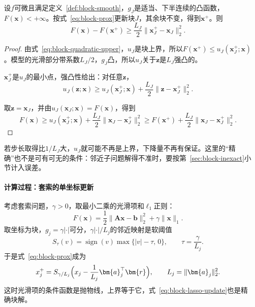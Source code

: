 \begin{lemma}[块邻近步的下降量]
\label{lem:block-prox-descent}
设$f$可微且满足定义~\ref{def:block-smooth}，$g_J$是适当、下半连续的凸函数，$F(\bm{x})<+\infty$。按式~\eqref{eq:block-prox}更新块$J$，其余块不变，得到$\bm{x}^{+}$。则
\begin{equation}
 F(\bm{x})-F(\bm{x}^{+})\geq\frac{L_J}{2}\lVert\bm{x}_J^{+}-\bm{x}_J\rVert_2^2 .
 \label{eq:block-prox-descent}
\end{equation}
\end{lemma}

\begin{proof}
由式~\eqref{eq:block-quadratic-upper}，$u_J$是块上界，所以$F(\bm{x}^{+})\leq u_J(\bm{x}_J^{+};\bm{x})$。模型的光滑部分带系数$L_J/2$，$g_J$凸，所以$u_J$关于$\bm{z}$是$L_J$强凸的。

$\bm{x}_J^{+}$是$u_J$的最小点，强凸性给出：对任意$\bm{z}$，
\[
 u_J(\bm{z};\bm{x})\geq u_J(\bm{x}_J^{+};\bm{x})+\frac{L_J}{2}\lVert\bm{z}-\bm{x}_J^{+}\rVert_2^2 .
\]

取$\bm{z}=\bm{x}_J$，并由$u_J(\bm{x}_J;\bm{x})=F(\bm{x})$，得到
\[
 F(\bm{x})\geq u_J(\bm{x}_J^{+};\bm{x})+\frac{L_J}{2}\lVert\bm{x}_J-\bm{x}_J^{+}\rVert_2^2\geq F(\bm{x}^{+})+\frac{L_J}{2}\lVert\bm{x}_J-\bm{x}_J^{+}\rVert_2^2 .
\]
\end{proof}

若步长取得比$1/L_J$大，$u_J$就可能不再是上界，下降量不再有保证。这里的“精确”也不是可有可无的条件：邻近子问题解得不准时，要按第~\ref{sec:block-inexact}小节计入误差。

\paragraph{计算过程：套索的单坐标更新}
考虑套索问题，$\gamma>0$，取最小二乘的光滑项和$\ell_1$正则：
\[
 F(\bm{x})=\frac12\lVert\bm{A}\bm{x}-\bm{b}\rVert_2^2+\gamma\lVert\bm{x}\rVert_1 .
\]
取坐标为块，$g_j=\gamma\lvert\cdot\rvert$可分，$\gamma\lvert\cdot\rvert/L_j$的邻近映射是软阈值
\begin{equation}
 S_{\tau}(v)=\operatorname{sign}(v)\max\{\lvert v\rvert-\tau,\,0\},\qquad \tau=\frac{\gamma}{L_j}.
 \label{eq:block-soft-threshold}
\end{equation}
于是式~\eqref{eq:block-prox}成为
\begin{equation}
 x_j^{+}=S_{\gamma/L_j}\Bigl(x_j-\frac{1}{L_j}\bm{a}_j^\top\bm{r}\Bigr),\qquad L_j=\lVert\bm{a}_j\rVert_2^2 .
 \label{eq:block-lasso-update}
\end{equation}
这时光滑项的条件函数是抛物线，上界等于它，式~\eqref{eq:block-lasso-update}也是精确块解。

